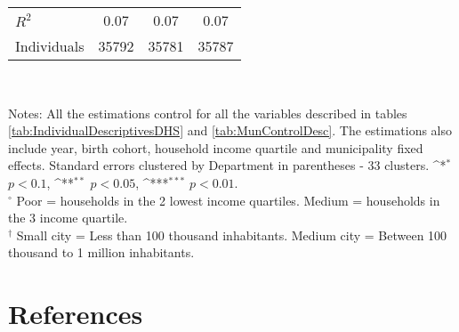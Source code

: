 \documentclass[a4paper,10pt,twocolumn,preprint,3p,authoryear]{elsarticle}
\def\sym#1{\ifmmode^{#1}\else\(^{#1}\)\fi}
\begin{document}
\begin{appendix}
\begin{table}[h]
\begin{tabular}{lccc}
$R^{2}$	&	0.07	&	0.07	&	        0.07         \\
Individuals	&	35792	&	35781	&	       35787         \\ 
\hline
	\end{tabular} \\ 
	\begin{minipage}[t]{1\columnwidth}%
		  \begin{spacing}{1}
		  \noindent 
		  {Notes: All the estimations control for all the variables described in tables \ref{tab:IndividualDescriptivesDHS} and \ref{tab:MunControlDesc}. The estimations also include year, birth cohort, household income quartile and municipality fixed effects. Standard errors clustered by Department in parentheses - 33 clusters. \sym{*} $p<0.1$, \sym{**} $p<0.05$, \sym{***} $p<0.01$. \\
			 $^{\circ}$ Poor = households in the 2 lowest income quartiles. Medium = households in the 3 income quartile. \\
			 $^{\dagger}$ Small city = Less than 100 thousand inhabitants. Medium city = Between 100 thousand to 1 million inhabitants. 
		 } 		 
		  \end{spacing}
	  \end{minipage}
	\label{tab:SSInterctions}
\end{table}

\end{appendix}

\clearpage
\section*{References}


\end{document}
